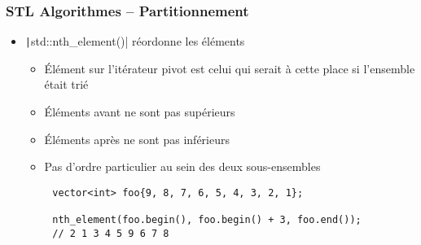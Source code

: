\documentclass[C++.tex]{subfiles}
\begin{document}
\begin{frame}[fragile]
	\frametitle{STL Algorithmes -- Partitionnement}
	\begin{itemize}
		\item \texttt|std::nth_element()| réordonne les éléments
		\begin{itemize}
			\item Élément sur l'itérateur pivot est celui qui serait à cette place si l'ensemble était trié
			\item Éléments avant ne sont pas supérieurs
			\item Éléments après ne sont pas inférieurs
			\item Pas d'ordre particulier au sein des deux sous-ensembles
		\end{itemize}
	\end{itemize}


	\begin{verbatim}
		vector<int> foo{9, 8, 7, 6, 5, 4, 3, 2, 1};

		nth_element(foo.begin(), foo.begin() + 3, foo.end());
		// 2 1 3 4 5 9 6 7 8
	\end{verbatim}

\end{frame}
\end{document}
